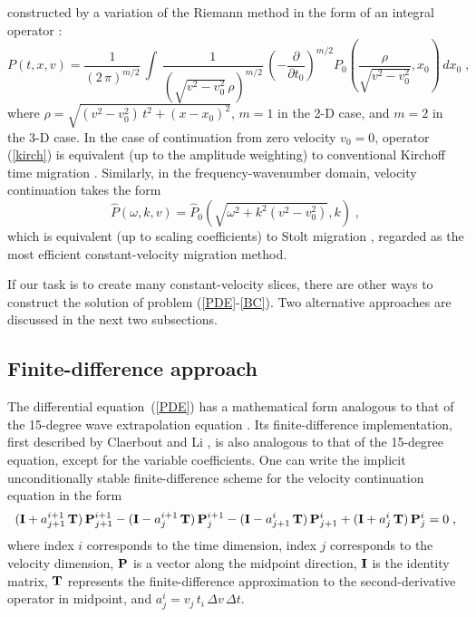 constructed by a variation of the Riemann method in the form of an
integral operator \cite{me,first}:
\begin{equation}
  \label{kirch}
  P(t,x,v) = \frac{1}{(2\,\pi)^{m/2}}\,\int\, 
  \frac{1}{(\sqrt{v^2-v_0^2}\,\rho)^{m/2}}\, 
  \left(- \frac{\partial}{\partial t_0}\right)^{m/2}
  P_0\left(\frac{\rho}{\sqrt{v^2-v_0^2}},x_0\right)\,dx_0\;,
\end{equation}
where $\rho = \sqrt{(v^2-v_0^2)\,t^2 + (x - x_0)^2}$, $m=1$ in the 2-D
case, and $m=2$ in the 3-D case. In the case of continuation from zero
velocity $v_0=0$, operator (\ref{kirch}) is equivalent (up to the
amplitude weighting) to conventional Kirchoff time migration
\cite{GEO43.01.00490076}.  Similarly, in the frequency-wavenumber
domain, velocity continuation takes the form
\begin{equation}
  \label{stolt}
  \hat{P} (\omega,k,v) = \hat{P}_0 (\sqrt{\omega^2+k^2 (v^2-v_0^2)},k)\;,
\end{equation}
which is equivalent (up to scaling coefficients) to Stolt migration
\cite{GEO43.01.00230048}, regarded as the most efficient constant-velocity
migration method.
\par
If our task is to create many constant-velocity slices, there are
other ways to construct the solution of problem (\ref{PDE}-\ref{BC}).
Two alternative approaches are discussed in the next two
subsections.
\subsection{Finite-difference approach}
The differential equation~(\ref{PDE}) has a mathematical form analogous to
that of the 15-degree wave extrapolation equation
\cite{Claerbout.blackwell.76}. Its finite-difference implementation, first
described by Claerbout  and Li
, is also analogous to that of the 15-degree equation,
except for the variable coefficients. One can write the implicit
unconditionally stable finite-difference scheme for the velocity continuation
equation in the form
\begin{equation}
({\bf I} + a_{j+1}^{i+1}\,{\bf T})\,{\bf P}_{j+1}^{i+1} - 
({\bf I} - a_{j}^{i+1}\,{\bf T})\,{\bf P}_{j}^{i+1} -
({\bf I} - a_{j+1}^{i}\,{\bf T})\,{\bf P}_{j+1}^{i} + 
({\bf I} + a_{j}^{i}\,{\bf T})\,{\bf P}_{j}^{i} = 0\;, 
\label{eqn:fds} 
\end{equation}
where index $i$ corresponds to the time dimension, index $j$
corresponds to the velocity dimension, ${\bf P}$ is a vector along the
midpoint direction, ${\bf I}$ is the identity matrix, ${\bf T}$
represents the finite-difference approximation to the 
second-derivative operator in midpoint,
and $a_{j}^{i} = v_j\,t_i\,{\Delta v\,\Delta t}$.

